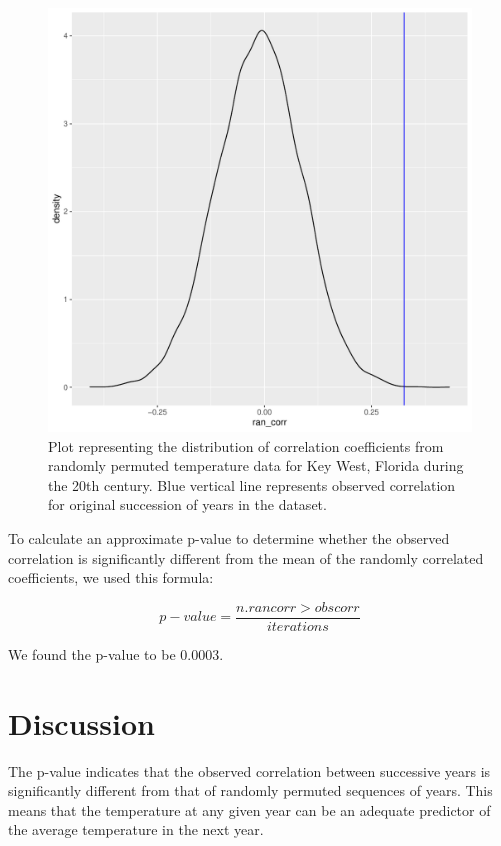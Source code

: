 \documentclass[12pt]{article}
\begin{document}
  \begin{figure}[h]
  \caption{Plot representing the distribution of correlation coefficients from randomly permuted temperature data for Key West, Florida during the 20th century. Blue vertical line represents observed correlation for original succession of years in the dataset.}
  \centering
  \includegraphics[scale=0.7]{ast_random_corr}
  \end{figure}
  
  
  To calculate an approximate p-value to determine whether the observed correlation is significantly different from the mean of the randomly correlated coefficients, we used this formula:

  \begin{equation}
    p-value = \frac{n.rancorr > obscorr}{iterations}
  \end{equation}

  We found the p-value to be 0.0003.

  \section{Discussion}
  The p-value indicates that the observed correlation between successive years is significantly different from that of randomly permuted sequences of years. This means that the temperature at any given year can be an adequate predictor of the average temperature in the next year.
\end{document}
